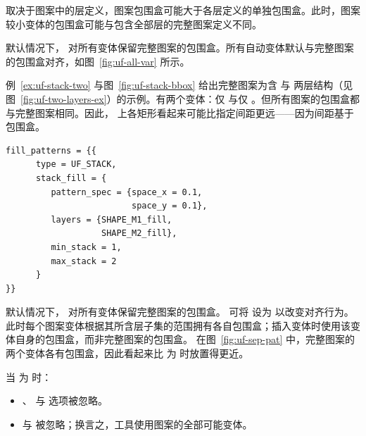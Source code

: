 
取决于图案中的层定义，图案包围盒可能大于各层定义的单独包围盒。此时，图案较小变体的包围盒可能与包含全部层的完整图案定义不同。

默认情况下， 对所有变体保留完整图案的包围盒。所有自动变体默认与完整图案的包围盒对齐，如图~\ref{fig:uf-all-var} 所示。

例~\ref{ex:uf-stack-two} 与图~\ref{fig:uf-stack-bbox} 给出完整图案为含  与  两层结构（见图~\ref{fig:uf-two-layers-ex}）的示例。有两个变体：仅  与仅 。但所有图案的包围盒都与完整图案相同。因此， 上各矩形看起来可能比指定间距更远——因为间距基于包围盒。


\begin{lstlisting}[style=pxl,caption={使用 stack\_fill 的两填充层图案结构},label={ex:uf-stack-two}]
fill_patterns = {{
      type = UF_STACK,
      stack_fill = {
         pattern_spec = {space_x = 0.1,
                         space_y = 0.1},
         layers = {SHAPE_M1_fill,
                   SHAPE_M2_fill},
         min_stack = 1,
         max_stack = 2
      }
}}
\end{lstlisting}


默认情况下， 对所有变体保留完整图案的包围盒。
可将  设为  以改变对齐行为。此时每个图案变体根据其所含层子集的范围拥有各自包围盒；插入变体时使用该变体自身的包围盒，而非完整图案的包围盒。
在图~\ref{fig:uf-sep-pat} 中，完整图案的两个变体各有包围盒，因此看起来比  为  时放置得更近。


当  为  时：
\begin{itemize}
  \item {}、 与  选项被忽略。
  \item {} 与  被忽略；换言之，工具使用图案的全部可能变体。
\end{itemize}

